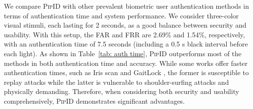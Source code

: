 \documentclass[sigconf]{acmart}
\newcommand{\sysname}{\textsc{PipID}\xspace}
\begin{document}
\begin{table}[t]
\centering
\caption{Comparison of Authentication Time and Performance Between \sysname and Existing Biometrics User Authentication Methods.}
\vspace{-2mm}
\label{tab: auth time}
\vspace{-4mm}
\end{table}

We compare \sysname with other prevalent biometric user authentication methods in terms of authentication time and system performance. We consider three-color visual stimuli, each lasting for 2 seconds, as a good balance between security and usability. With this setup, the FAR and FRR are 2.69\% and 1.54\%, respectively, with an authentication time of 7.5 seconds (including a 0.5 s black interval before each light). As shown in Table~\ref{tab: auth time}, \sysname outperforms most of the methods in both authentication time and accuracy. While some works offer faster authentication times, such as Iris scan \cite{Iris_BOUTROS2020104007} and GaitLock \cite{GaitLock}, the former is susceptible to replay attacks while the latter is vulnerable to shoulder-surfing attacks and physically demanding. Therefore, when considering both security and usability comprehensively, \sysname demonstrates significant advantages.
\end{document}
